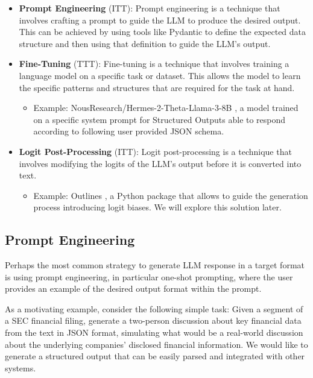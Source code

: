 \begin{itemize}
    \item \textbf{Prompt Engineering} (ITT): Prompt engineering is a technique that involves crafting a prompt to guide the LLM to produce the desired output. This can be achieved by using tools like Pydantic to define the expected data structure and then using that definition to guide the LLM's output.

    \item \textbf{Fine-Tuning} (TTT): Fine-tuning is a technique that involves training a language model on a specific task or dataset. This allows the model to learn the specific patterns and structures that are required for the task at hand.
    \begin{itemize}
        \item Example: NousResearch/Hermes-2-Theta-Llama-3-8B \cite{Hermes-2-Theta-Llama-3-8B}, a model trained on a specific system prompt for Structured Outputs able to respond according to following user provided JSON schema.
    \end{itemize}

    \item \textbf{Logit Post-Processing} (ITT): Logit post-processing is a technique that involves modifying the logits of the LLM's output before it is converted into text.
    \begin{itemize}
        \item Example: Outlines \cite{outlines2024}, a Python package that allows to guide the generation process introducing logit biases. We will explore this solution later.
    \end{itemize}
\end{itemize}

\subsection{Prompt Engineering}

Perhaps the most common strategy to generate LLM response in a target format is using prompt engineering, in particular one-shot prompting, where the user provides an example of the desired output format within the prompt.

As a motivating example, consider the following simple task: Given a segment of a SEC financial filing, generate a two-person discussion about key financial data from the text in JSON format, simulating what would be a real-world discussion about the underlying companies' disclosed financial information. We would like to generate a structured output that can be easily parsed and integrated with other systems.

